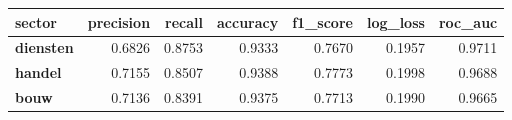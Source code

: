 \begin{tabular}{lrrrrrr}
    \toprule
    \textbf{sector} & \textbf{precision} & \textbf{recall} & \textbf{accuracy} & \textbf{f1\_score} & \textbf{log\_loss} & \textbf{roc\_auc} \\
    \midrule
    \textbf{diensten} & 0.6826 & 0.8753 & 0.9333 & 0.7670 & 0.1957 & 0.9711 \\
    \textbf{handel}   & 0.7155 & 0.8507 & 0.9388 & 0.7773 & 0.1998 & 0.9688 \\
    \textbf{bouw}     & 0.7136 & 0.8391 & 0.9375 & 0.7713 & 0.1990 & 0.9665 \\
    \bottomrule
\end{tabular}